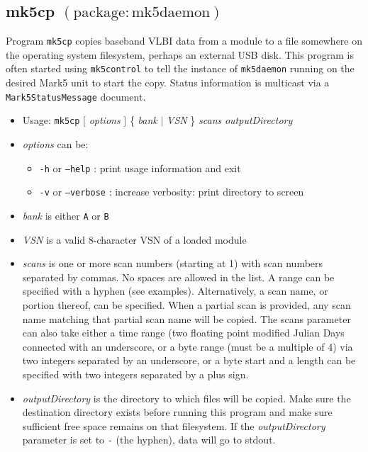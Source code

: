 
\subsection{mk5cp {\small $\mathrm{(package: mk5daemon)}$}} \label{sec:mk5cp}

Program {\tt mk5cp} copies baseband VLBI data from a module to a file somewhere on the operating system filesystem, perhaps an external USB disk.
This program is often started using {\tt mk5control} to tell the instance of {\tt mk5daemon} running on the desired Mark5 unit to start the copy.
Status information is multicast via a {\tt Mark5StatusMessage} document.

\begin{itemize}
\item[] Usage: {\tt mk5cp} $[$ {\em options} $]$ \{ {\em bank} $\mid$ {\em VSN} \} {\em scans} {\em outputDirectory}
\item[] {\em options} can be:
\begin{itemize}
\item[] {\tt -h} or {\tt --help} : print usage information and exit
\item[] {\tt -v} or {\tt --verbose} : increase verbosity: print directory to screen
\end{itemize}
\item[] {\em bank} is either {\tt A} or {\tt B}
\item[] {\em VSN} is a valid 8-character VSN of a loaded module
\item[] {\em scans} is one or more scan numbers (starting at 1) with scan numbers separated by commas.
No spaces are allowed in the list.
A range can be specified with a hyphen (see examples).
Alternatively, a scan name, or portion thereof, can be specified.
When a partial scan is provided, any scan name matching that partial scan name will be copied.
The scans parameter can also take either a time range (two floating point modified Julian Days connected with an underscore, or a byte range (must be a multiple of 4) via two integers separated by an underscore, or a byte start and a length can be specified with two integers separated by a plus sign.
\item[] {\em outputDirectory} is the directory to which files will be copied.
Make sure the destination directory exists before running this program and make sure sufficient free space remains on that filesystem.
If the {\em outputDirectory} parameter is set to {\tt -} (the hyphen), data will go to stdout.

\end{itemize}
